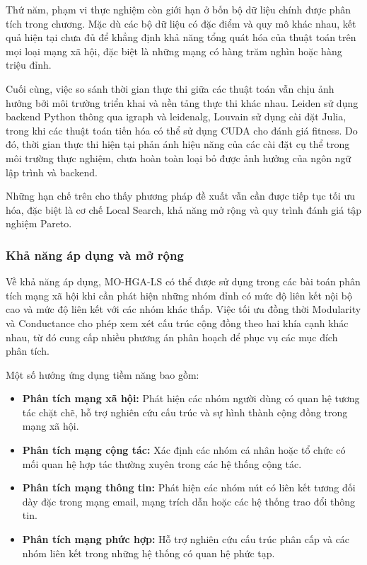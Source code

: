 \documentclass[14pt,a4paper]{extarticle}
\begin{document}
Thứ năm, phạm vi thực nghiệm còn giới hạn ở bốn bộ dữ liệu chính được phân tích trong chương. Mặc dù các bộ dữ liệu có đặc điểm và quy mô khác nhau, kết quả hiện tại chưa đủ để khẳng định khả năng tổng quát hóa của thuật toán trên mọi loại mạng xã hội, đặc biệt là những mạng có hàng trăm nghìn hoặc hàng triệu đỉnh.

Cuối cùng, việc so sánh thời gian thực thi giữa các thuật toán vẫn chịu ảnh hưởng bởi môi trường triển khai và nền tảng thực thi khác nhau. Leiden sử dụng backend Python thông qua igraph và leidenalg, Louvain sử dụng cài đặt Julia, trong khi các thuật toán tiến hóa có thể sử dụng CUDA cho đánh giá fitness. Do đó, thời gian thực thi hiện tại phản ánh hiệu năng của các cài đặt cụ thể trong môi trường thực nghiệm, chưa hoàn toàn loại bỏ được ảnh hưởng của ngôn ngữ lập trình và backend.

Những hạn chế trên cho thấy phương pháp đề xuất vẫn cần được tiếp tục tối ưu hóa, đặc biệt là cơ chế Local Search, khả năng mở rộng và quy trình đánh giá tập nghiệm Pareto.

\subsubsection{Khả năng áp dụng và mở rộng}

Về khả năng áp dụng, MO-HGA-LS có thể được sử dụng trong các bài toán phân tích mạng xã hội khi cần phát hiện những nhóm đỉnh có mức độ liên kết nội bộ cao và mức độ liên kết với các nhóm khác thấp. Việc tối ưu đồng thời Modularity và Conductance cho phép xem xét cấu trúc cộng đồng theo hai khía cạnh khác nhau, từ đó cung cấp nhiều phương án phân hoạch để phục vụ các mục đích phân tích.

Một số hướng ứng dụng tiềm năng bao gồm:

\begin{itemize}
    \item \textbf{Phân tích mạng xã hội:} Phát hiện các nhóm người dùng có quan hệ tương tác chặt chẽ, hỗ trợ nghiên cứu cấu trúc và sự hình thành cộng đồng trong mạng xã hội.
    
    \item \textbf{Phân tích mạng cộng tác:} Xác định các nhóm cá nhân hoặc tổ chức có mối quan hệ hợp tác thường xuyên trong các hệ thống cộng tác.
    
    \item \textbf{Phân tích mạng thông tin:} Phát hiện các nhóm nút có liên kết tương đối dày đặc trong mạng email, mạng trích dẫn hoặc các hệ thống trao đổi thông tin.
    
    \item \textbf{Phân tích mạng phức hợp:} Hỗ trợ nghiên cứu cấu trúc phân cấp và các nhóm liên kết trong những hệ thống có quan hệ phức tạp.
\end{itemize}
\end{document}
